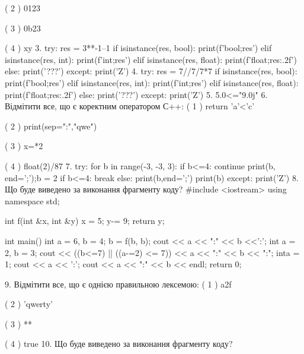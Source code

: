 \documentclass[11pt]{article}
\begin{document}
( 2 ) 0123

( 3 ) 0b23

( 4 ) xy
\vspace{5mm}
3. 
try:
    res = 3**-1--1
    if isinstance(res, bool):
        print(f'bool;{res}')
    elif isinstance(res, int):
        print(f'int;{res}')
    elif isinstance(res, float):
        print(f'float;{res:.2f}')
    else:
        print('???')
except:
    print('Z')
\vspace{5mm}
4. 
try:
    res = 7//7/7*7
    if isinstance(res, bool):
        print(f'bool;{res}')
    elif isinstance(res, int):
        print(f'int;{res}')
    elif isinstance(res, float):
        print(f'float;{res:.2f}')
    else:
        print('???')
except:
    print('Z')
\vspace{5mm}
5. 
5.0<="9.0j"\vspace{5mm}
6. %
Відмітити все, що є коректним оператором С++:
( 1 ) return 'a'<'c'

( 2 ) print(sep=":","qwe")

( 3 ) x=*2

( 4 ) float(2)/87
\vspace{5mm}
7. 
try:
    for b in range(-3, -3, 3):
        if b<=4:
            continue
        print(b, end=';');b = 2
        if b<=4:
            break
    else:
        print(b,end=';')
    print(b)
except:
    print('Z')
\vspace{5mm}
8. Що буде виведено за виконання фрагменту коду?
#include <iostream>
using namespace std;

int f(int &x, int &y){
    x = 5;
    y-= 9;
    return y;
}

int main(){
    int a = 6, b = 4;
    b = f(b, b);
    cout << a << ":" << b <<':';
    {
        int a = 2, b = 3;
        cout << ((b<=7) || ((a-=2) <= 7))
             << a << ":" << b << ":";
    }
    {
        inta = 1;
        cout << a << ':';
    }
    cout << a << ":" << b << endl;
    return 0;
}

\vspace{5mm}
9. %
Відмітити все, що є однією правильною лексемою:
( 1 ) a2f

( 2 ) 'qwerty'

( 3 ) **

( 4 ) true
\vspace{5mm}
10. Що буде виведено за виконання фрагменту коду?
\end{document}
